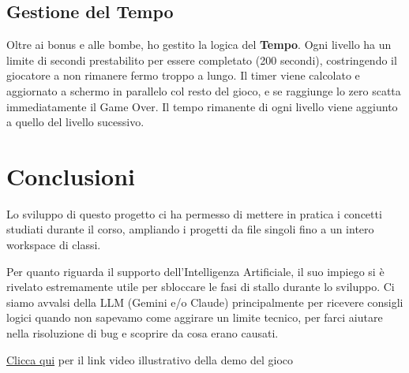 \documentclass[11pt,a4paper]{article}
\begin{document}
\subsection{Gestione del Tempo}
Oltre ai bonus e alle bombe, ho gestito la logica del \textbf{Tempo}. Ogni livello ha un limite di secondi prestabilito per essere completato (200 secondi), costringendo il giocatore a non rimanere fermo troppo a lungo. Il timer viene calcolato e aggiornato a schermo in parallelo col resto del gioco, e se raggiunge lo zero scatta immediatamente il Game Over. Il tempo rimanente di ogni livello viene aggiunto a quello del livello sucessivo.

\newpage
\section{Conclusioni}
Lo sviluppo di questo progetto ci ha permesso di mettere in pratica i concetti studiati durante il corso, ampliando i progetti da file singoli fino a un intero workspace di classi.

Per quanto riguarda il supporto dell'Intelligenza Artificiale, il suo impiego si \`e rivelato estremamente utile per sbloccare le fasi di stallo durante lo sviluppo. Ci siamo avvalsi della LLM (Gemini e/o Claude) principalmente per ricevere consigli logici quando non sapevamo come aggirare un limite tecnico, per farci aiutare nella risoluzione di bug e scoprire da cosa erano causati.

\href{https://drive.google.com/file/d/1Xkvq53LNjwL0HlNmUK7vDq5v5aAl7pTv/view?usp=drive_link}{Clicca qui} per il link video illustrativo della demo del gioco
\end{document}
